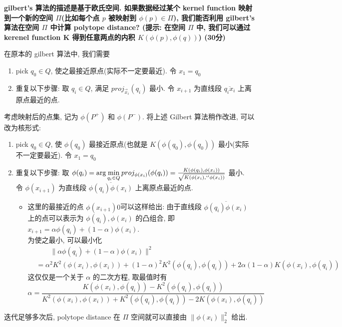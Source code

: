 \documentclass[UTF8]{article}
\newcommand{\jumpLine} {\hspace*{\fill} \par}
\begin{document}
\noindent \textbf{gilbert's 算法的描述是基于欧氏空间. 如果数据经过某个 kernel function 映射到一个新的空间 $\Pi$(比如每个点 $p$ 被映射到 $\phi(p)\in\Pi$), 我们能否利用 gilbert's 算法在空间 $\Pi$ 中计算 polytope distance? (提示: 在空间 $\Pi$ 中, 我们可以通过 kerenel function K 得到任意两点的内积 $K(\phi(p), \phi(q))$) (30分)} \\\jumpLine\noindent
在原本的 gilbert 算法中, 我们需要
\begin{enumerate}
	\item pick $q_0 \in Q$, 使之最接近原点(实际不一定要最近). 令 $x_1 = q_0$
	\item 重复以下步骤: 取 $q_i \in Q$, 满足 $proj_{\vec{x}_i}(q_i)$ 最小. 令 $x_{i+1}$ 为直线段 $\overline{q_i x_i}$ 上离原点最近的点. 
\end{enumerate}
考虑映射后的点集, 记为 $\phi(P^+)$ 和 $\phi(P^-)$. 将上述 Gilbert 算法稍作改进, 可以改为核形式:
\begin{enumerate}
	\item pick $q_0 \in Q$, 使 $\phi(q_0)$ 最接近原点(也就是 $K(\phi(q_0), \phi(q_0))$ 最小(实际不一定要最近). 令 $x_1 = q_0$
	\item 重复以下步骤: 取 $\phi(q_i) =\arg\min\limits_{q_i \in Q} proj_{\phi({x}_i)}(\phi(q_i))=\frac{K(\phi(q_i), \phi(x_i))}{\sqrt{K(\phi(x_i), `'\phi(x_i))}}$ 最小.  \\
	令 $\phi(x_{i+1})$ 为直线段 $\overline{\phi(q_i) \phi(x_i)}$ 上离原点最近的点. 
	\begin{itemize}
		\item 这里的最接近的点 $\phi(x_{i+1})0$可以这样给出: 由于直线段 $\overline{\phi(q_i) \phi(x_i)}$ 上的点可以表示为 $\phi(q_i), \phi(x_i)$ 的凸组合, 即 $x_{i+1}=\alpha\phi(q_i) + (1-\alpha) \phi(x_i)$. \\
		为使之最小, 可以最小化
		\begin{align*}
			&\qquad\|\alpha\phi(q_i) + (1-\alpha) \phi(x_i)\|^2 \\
			&=\alpha^2 K^2(\phi(x_i), \phi(x_i)) + (1-\alpha)^2 K^2(\phi(q_i), \phi(q_i)) + 2\alpha(1-\alpha)K(\phi(x_i), \phi(q_i))
		\end{align*}
		这仅仅是一个关于 $\alpha$ 的二次方程, 取最值时有
		$$\alpha=\frac{K(\phi(x_i), \phi(q_i)) - K^2(\phi(q_i), \phi(q_i))}{K^2(\phi(x_i), \phi(x_i)) + K^2(\phi(q_i), \phi(q_i)) - 2K(\phi(x_i), \phi(q_i))}$$
	\end{itemize}
\end{enumerate}
迭代足够多次后, polytope distance 在 $\Pi$ 空间就可以直接由 $\|\phi(x_i)\|_2^2$ 给出.
\end{document}
